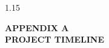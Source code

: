 \begin{spacing}{1.15}
\pagestyle{plain}

\clearpage
\thispagestyle{plain}
\pagestyle{plain}
\markboth{}{}
\renewcommand{\thefigure}{A.\arabic{figure}}
\setcounter{figure}{0}
\renewcommand{\thetable}{A.\arabic{table}}
\setcounter{table}{0}
\renewcommand{\theequation}{A.\arabic{equation}}
\setcounter{equation}{0}

\vspace*{-0.5cm}

\begin{center}
{\Large \textbf{APPENDIX A\\[0.35em] PROJECT TIMELINE}}\par
\end{center}

\vspace{0.3cm}


\end{spacing}

